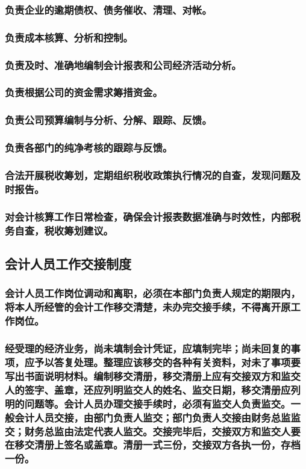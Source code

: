 \documentclass{ctexart}
\begin{document}
\subsubsection{负责企业的逾期债权、债务催收、清理、对帐。}
\label{sec-1-7-3}
\subsubsection{负责成本核算、分析和控制。}
\label{sec-1-7-4}
\subsubsection{负责及时、准确地编制会计报表和公司经济活动分析。}
\label{sec-1-7-5}
\subsubsection{负责根据公司的资金需求筹措资金。}
\label{sec-1-7-6}
\subsubsection{负责公司预算编制与分析、分解、跟踪、反馈。}
\label{sec-1-7-7}
\subsubsection{负责各部门的纯净考核的跟踪与反馈。}
\label{sec-1-7-8}
\subsubsection{合法开展税收筹划，定期组织税收政策执行情况的自查，发现问题及时报告。}
\label{sec-1-7-9}
\subsubsection{对会计核算工作日常检查，确保会计报表数据准确与时效性，内部税务自查，税收筹划建议。}
\label{sec-1-7-10}
\subsection{会计人员工作交接制度}
\label{sec-1-8}
\subsubsection{会计人员工作岗位调动和离职，必须在本部门负责人规定的期限内，将本人所经管的会计工作移交清楚，未办完交接手续，不得离开原工作岗位。}
\label{sec-1-8-1}
\subsubsection{经受理的经济业务，尚未填制会计凭证，应填制完毕；尚未回复的事项，应予以答复处理。整理应该移交的各种有关资料，对未了事项要写出书面说明材料。编制移交清册，移交清册上应有交接双方和监交人的签字、盖章，还应列明监交人的姓名、监交日期，移交清册应列明的问题等。会计人员办理交接手续时，必须有监交人负责监交。一般会计人员交接，由部门负责人监交；部门负责人交接由财务总监监交；财务总监由法定代表人监交。交接完毕后，交接双方和监交人要在移交清册上签名或盖章。清册一式三份，交接双方各执一份，存档一份。}
\label{sec-1-8-2}
\end{document}
